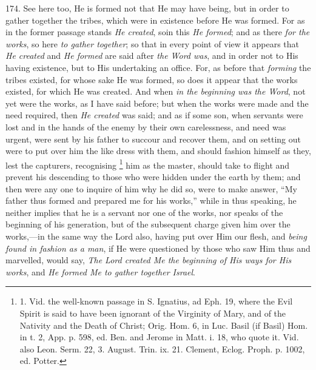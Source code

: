 174. See here too, He is
formed not that He may have being, but in order to gather together the
tribes, which were in existence before He was formed. For as in the
former passage stands \emph{He created}, so\emph{}in this \emph{He
formed}; and as there \emph{for the works}, so here \emph{to gather
together}; so that in every point of view it appears that \emph{He
created} and \emph{He formed} are said after \emph{the Word was},
and in order not to His having existence, but to His undertaking an
office. For, as before that \emph{forming} the tribes existed, for
whose sake He was formed, so does it appear that the works existed,
for which He was created. And when \emph{in the beginning was the Word},
not yet were the works, as I have said before; but when the works were
made and the need required, then \emph{He created} was said; and as if
some son, when servants were lost and in the hands of the enemy by
their own carelessness, and need was urgent, were sent by his father
to succour and recover them, and on setting out were to put over him
the like dress with them, and should fashion himself as they, lest the
capturers, recognising \footnote{

1. Vid. the well-known passage
in S. Ignatius, ad Eph. 19, where the Evil Spirit is said to have been
ignorant of the Virginity of Mary, and of the Nativity and the Death
of Christ; Orig. Hom. 6, in Luc. Basil (if Basil) Hom. in t. 2, App.
p. 598, ed. Ben. and Jerome in Matt. i. 18, who quote it. Vid. also
Leon. Serm. 22, 3. August. Trin. ix. 21. Clement, Eclog. Proph. p.
1002, ed. Potter.}
him as the master, should take to flight and prevent his descending to
those who were hidden under the earth by them; and then were any one
to inquire of him why he did so, were to make answer, ``My father thus
formed and prepared me for his works,'' while in thus speaking, he
neither implies that he is a servant nor one of the works, nor speaks
of the beginning of his generation, but of the subsequent charge given
him over the works,—in the same way the Lord also, having put
over Him our flesh, and \emph{being found in fashion as a man}, if He
were questioned by those who saw Him thus and marvelled, would say, \emph{The
Lord created Me the beginning of His ways for His works}, and \emph{He
formed Me to gather together Israel}.

